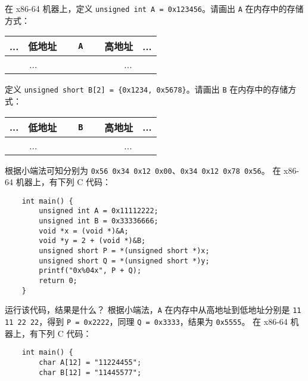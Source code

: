     \begin{problems}
        \pro 在 x86-64 机器上，定义 \texttt{unsigned int A = 0x123456}。请画出 \texttt{A} 在内存中的存储方式：
        \begin{table}[H]
            \centering
            \begin{tabular}{|c|c|c|c|c|c|c|c|}
                \hline
                ... & 低地址 & \multicolumn{4}{c|}{\texttt{A}} & 高地址 & ... \\ \hline
                \multicolumn{2}{|c|}{...} & {\qquad \qquad} & {\qquad \qquad} & {\qquad \qquad} & {\qquad \qquad} & \multicolumn{2}{c|}{...} \\ \hline
            \end{tabular}
        \end{table}
        定义 \texttt{unsigned short B[2] = \{0x1234, 0x5678\}}。请画出 \texttt{B} 在内存中的存储方式：
        \begin{table}[H]
            \centering
            \begin{tabular}{|c|c|c|c|c|c|c|c|}
                \hline
                ... & 低地址 & \multicolumn{4}{c|}{\texttt{B}} & 高地址 & ... \\ \hline
                \multicolumn{2}{|c|}{...} & {\qquad \qquad} & {\qquad \qquad} & {\qquad \qquad} & {\qquad \qquad} & \multicolumn{2}{c|}{...} \\ \hline
            \end{tabular}
        \end{table}
        \sol 根据小端法可知分别为 \verb|0x56 0x34 0x12 0x00|、\verb|0x34 0x12 0x78 0x56|。
        \pro 在 x86-64 机器上，有下列 C 代码：
        \begin{verbatim}
    int main() {
        unsigned int A = 0x11112222;
        unsigned int B = 0x33336666;
        void *x = (void *)&A;
        void *y = 2 + (void *)&B;
        unsigned short P = *(unsigned short *)x;
        unsigned short Q = *(unsigned short *)y;
        printf("0x%04x", P + Q);
        return 0;
    }
        \end{verbatim}
        运行该代码，结果是什么？
        \sol 根据小端法，\verb|A| 在内存中从高地址到低地址分别是 \verb|11 11 22 22|，得到 \verb|P = 0x2222|，同理 \verb|Q = 0x3333|，结果为 \verb|0x5555|。
        \pro 在 x86-64 机器上，有下列 C 代码：
        \begin{verbatim}
    int main() {
        char A[12] = "11224455";
        char B[12] = "11445577";

\end{verbatim}
\end{problems}
